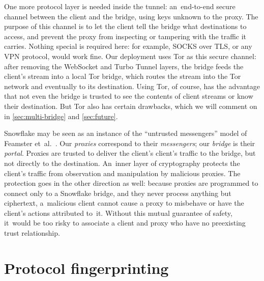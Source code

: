 \documentclass[letterpaper,twocolumn]{article}
\newcommand{\firstterm}[1]{\textit{#1}}
\begin{document}
One more protocol layer is needed inside the tunnel:
an~end-to-end secure channel between the client and the bridge,
using keys unknown to the proxy.
The purpose of this channel is to let
the client tell the bridge what destinations to access,
and prevent the proxy from inspecting or tampering with the traffic
it carries.
Nothing special is required here: for example,
SOCKS over TLS,
or any VPN protocol,
would work fine.
Our deployment uses Tor as this secure channel:
after removing the WebSocket and Turbo Tunnel layers,
the bridge feeds the client's stream into a local Tor bridge,
which routes the stream into the Tor network
and eventually to its destination.
Using Tor, of course,
has the advantage that not even the bridge
is trusted to see the contents of client streams
or know their destination.
But Tor also has certain drawbacks,
which we will comment on in
\autoref{sec:multi-bridge}
and
\autoref{sec:future}.

Snowflake may be seen as an instance of the
``untrusted messengers'' model of Feamster et~al.~\cite[\S 3]{Feamster2003a}.
Our \firstterm{proxies} correspond to their \firstterm{messengers};
our \firstterm{bridge} is their \firstterm{portal}.
Proxies are trusted to deliver the client's client's traffic to the bridge,
but not directly to the destination.
An~inner layer of cryptography protects the client's traffic
from observation and manipulation by malicious proxies.
The protection goes in the other direction as well:
because proxies are programmed to connect only to a Snowflake bridge,
and they never process anything but ciphertext,
a~malicious client cannot cause a proxy to misbehave
or have the client's actions attributed to~it.
Without this mutual guarantee of safety,
it~would be too risky to associate a client and proxy
who have no preexisting trust relationship.

\section{Protocol fingerprinting}
\label{sec:fingerprinting}

\end{document}
